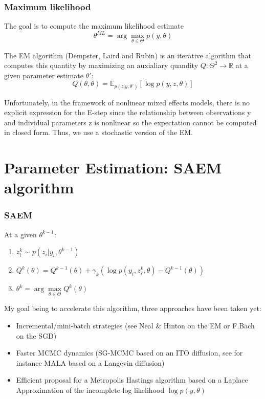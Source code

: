 \documentclass[xcolor={dvipsnames}]{beamer}
\begin{document}
\begin{frame}
\frametitle{Maximum likelihood}

The goal is to compute the maximum likelihood estimate
\begin{equation}
\theta^{ML} = \arg \max \limits_{\theta \in \Theta} p(y,\theta)
\end{equation}

The EM algorithm (Dempster, Laird and Rubin) is an iterative algorithm that computes this quantity by maximizing an auxialiary quandity $Q: \Theta^2 \to \mathbb{R}$ at a given parameter estimate $\theta'$:
\begin{equation}
Q(\theta, \theta) = \mathbb{E}_{p(z|y,\theta')}\left[ \log p(y, z, \theta) \right]
\end{equation}

Unfortunately, in the framework of nonlinear mixed effects models, there is no explicit expression for the E-step since the relationship between observations y and individual parameters z is nonlinear so the expectation cannot be computed in closed form. Thus, we use a stochastic version of the EM.
\end{frame}



\section{Parameter Estimation: SAEM algorithm}

\begin{frame}
\frametitle{SAEM}
At a given $\theta^{k-1}$:
\begin{enumerate}
  \item $z_i^k \sim p(z_i|y_i,\theta^{k-1})$
  \item $Q^k(\theta) = Q^{k-1}(\theta)+ \gamma_k(\log p(y_i, z_i^k, \theta) - Q^{k-1}(\theta))$
  \item $\theta ^k = \arg \max \limits_{\theta \in \Theta} Q^k(\theta)$
\end{enumerate}


My goal being to accelerate this algorithm, three approaches have been taken yet:
\begin{itemize}
  \item Incremental/mini-batch strategies (see Neal $\&$ Hinton on the EM or F.Bach on the SGD)
  \item Faster MCMC dynamics (SG-MCMC based on an ITO diffusion, see for instance MALA based on a Langevin diffusion)
  \item Efficient proposal for a Metropolis Hastings algorithm based on a Laplace Approximation of the incomplete log likelihood $\log p(y,\theta)$
\end{itemize}


\end{frame}
\end{document}
